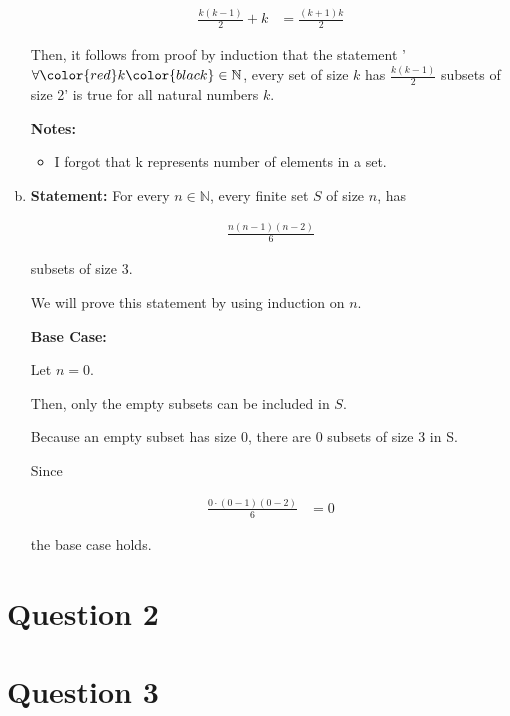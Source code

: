 \documentclass[12pt]{article}
\begin{document}
\begin{enumerate}[a.]
\begin{mdframed}
        \color{red}
        \begin{align}
            \frac{k(k-1)}{2} + k &= \frac{(k+1)k}{2}
        \end{align}
        \color{black}

        \bigskip

        Then, it follows from proof by induction that the statement '$\forall \color{red}k\color{black} \in \mathbb{N}$,
        every set of size \color{red}$k$\color{black} has \color{red}$\frac{k(k-1)}{2}$\color{black} subsets of size 2' is true for all
        natural numbers \color{red}$k$\color{black}.

    \end{mdframed}

    \textbf{Notes:}
    \begin{itemize}
        \item I forgot that k represents number of elements in a set.
    \end{itemize}


    \item

    \textbf{Statement:} For every $n \in \mathbb{N}$, every finite set $S$ of size $n$,
    has

    \setcounter{equation}{0}
    \begin{align}
        \frac{n(n-1)(n-2)}{6}
    \end{align}

    subsets of size 3.

    \bigskip

    We will prove this statement by using induction on $n$.

    \bigskip

    \textbf{Base Case:}

    \bigskip

    Let $n = 0$.

    \bigskip

    Then, only the empty subsets can be included in $S$.

    \bigskip

    Because an empty subset has size 0, there are 0 subsets of size 3 in S.

    \bigskip

    Since

    \begin{align}
        \frac{0 \cdot (0-1)(0-2)}{6} &= 0
    \end{align}

    the base case holds.




\end{enumerate}

\section*{Question 2}

\section*{Question 3}
\end{document}
